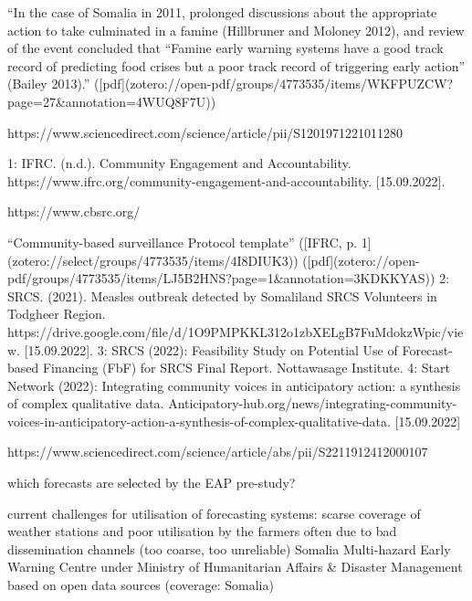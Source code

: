 {“In the case of Somalia in 2011, prolonged discussions about the appropriate action to take culminated in a famine (Hillbruner and Moloney 2012), and review of the event concluded that “Famine early warning systems have a good track record of predicting food crises but a poor track record of triggering early action” (Bailey 2013).” ([pdf](zotero://open-pdf/groups/4773535/items/WKFPUZCW?page=27&annotation=4WUQ8F7U))

https://www.sciencedirect.com/science/article/pii/S1201971221011280


1: IFRC. (n.d.). Community Engagement and Accountability. https://www.ifrc.org/community-engagement-and-accountability. [15.09.2022].

https://www.cbsrc.org/

“Community-based surveillance Protocol template” ([IFRC, p. 1](zotero://select/groups/4773535/items/4I8DIUK3)) ([pdf](zotero://open-pdf/groups/4773535/items/LJ5B2HNS?page=1&annotation=3KDKKYAS))
2: SRCS. (2021). Measles outbreak detected by Somaliland SRCS Volunteers in Todgheer Region. https://drive.google.com/file/d/1O9PMPKKL312o1zbXELgB7FuMdokzWpic/view. [15.09.2022].
3: SRCS (2022): Feasibility Study on Potential Use of Forecast-based Financing (FbF) for SRCS Final Report. Nottawasage Institute.
4: Start Network (2022): Integrating community voices in anticipatory action: a synthesis of complex qualitative data. Anticipatory-hub.org/news/integrating-community-voices-in-anticipatory-action-a-synthesis-of-complex-qualitative-data. [15.09.2022]

https://www.sciencedirect.com/science/article/abs/pii/S2211912412000107



which forecasts are selected by the EAP pre-study?

current challenges for utilisation of forecasting systems: scarse coverage of weather stations and poor utilisation by the farmers often due to bad dissemination channels  (too coarse, too unreliable)
Somalia Multi-hazard Early Warning Centre under Ministry of Humanitarian Affairs & Disaster Management
based on open data sources (coverage: Somalia)

}
